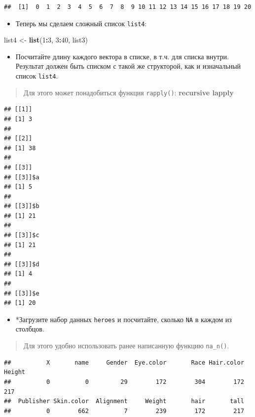 \documentclass[]{book}
\newenvironment{Shaded}{\begin{snugshade}}{\end{snugshade}}
\newcommand{\KeywordTok}[1]{\textcolor[rgb]{0.13,0.29,0.53}{\textbf{#1}}}
\newcommand{\DecValTok}[1]{\textcolor[rgb]{0.00,0.00,0.81}{#1}}
\newcommand{\StringTok}[1]{\textcolor[rgb]{0.31,0.60,0.02}{#1}}
\newcommand{\OperatorTok}[1]{\textcolor[rgb]{0.81,0.36,0.00}{\textbf{#1}}}
\newcommand{\NormalTok}[1]{#1}
\providecommand{\tightlist}{%
  \setlength{\itemsep}{0pt}\setlength{\parskip}{0pt}}
\begin{document}
\begin{verbatim}
##  [1]  0  1  2  3  4  5  6  7  8  9 10 11 12 13 14 15 16 17 18 19 20
\end{verbatim}

\begin{itemize}
\tightlist
\item
  Теперь мы сделаем сложный список \texttt{list4}:
\end{itemize}

\begin{Shaded}
\begin{Highlighting}[]
\NormalTok{list4 <-}\StringTok{ }\KeywordTok{list}\NormalTok{(}\DecValTok{1}\OperatorTok{:}\DecValTok{3}\NormalTok{, }\DecValTok{3}\OperatorTok{:}\DecValTok{40}\NormalTok{, list3)}
\end{Highlighting}
\end{Shaded}

\begin{itemize}
\tightlist
\item
  Посчитайте длину каждого вектора в списке, в т.ч. для списка внутри.
  Результат должен быть списком с такой же структорой, как и изначальный
  список \texttt{list4}.
\end{itemize}

\begin{quote}
Для этого может понадобиться функция \texttt{rapply()}:
\textbf{recursive lapply}
\end{quote}

\begin{verbatim}
## [[1]]
## [1] 3
## 
## [[2]]
## [1] 38
## 
## [[3]]
## [[3]]$a
## [1] 5
## 
## [[3]]$b
## [1] 21
## 
## [[3]]$c
## [1] 21
## 
## [[3]]$d
## [1] 4
## 
## [[3]]$e
## [1] 20
\end{verbatim}

\begin{itemize}
\tightlist
\item
  *Загрузите набор данных \texttt{heroes} и посчитайте, сколько
  \texttt{NA} в каждом из столбцов.
\end{itemize}

\begin{quote}
Для этого удобно использовать ранее написанную функцию \texttt{na\_n()}.
\end{quote}

\begin{verbatim}
##          X       name     Gender  Eye.color       Race Hair.color     Height 
##          0          0         29        172        304        172        217 
##  Publisher Skin.color  Alignment     Weight       hair       tall 
##          0        662          7        239        172        217
\end{verbatim}
\end{document}
